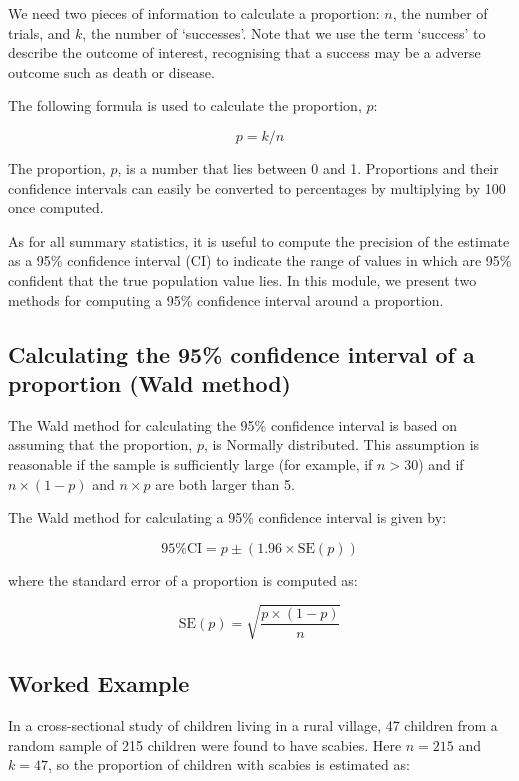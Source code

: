 \documentclass[
]{memoir}
\begin{document}
We need two pieces of information to calculate a proportion: \(n\), the number of trials, and \(k\), the number of `successes'. Note that we use the term `success' to describe the outcome of interest, recognising that a success may be a adverse outcome such as death or disease.

The following formula is used to calculate the proportion, \(p\):

\[ p = k / n \]

The proportion, \(p\), is a number that lies between 0 and 1. Proportions and their confidence intervals can easily be converted to percentages by multiplying by 100 once computed.

As for all summary statistics, it is useful to compute the precision of the estimate as a 95\% confidence interval (CI) to indicate the range of values in which are 95\% confident that the true population value lies. In this module, we present two methods for computing a 95\% confidence interval around a proportion.

\hypertarget{calculating-the-95-confidence-interval-of-a-proportion-wald-method}{%
\subsection{Calculating the 95\% confidence interval of a proportion (Wald method)}\label{calculating-the-95-confidence-interval-of-a-proportion-wald-method}}

The Wald method for calculating the 95\% confidence interval is based on assuming that the proportion, \(p\), is Normally distributed. This assumption is reasonable if the sample is sufficiently large (for example, if \(n>30\)) and if \(n \times (1-p)\) and \(n \times p\) are both larger than 5.

The Wald method for calculating a 95\% confidence interval is given by:

\[\text{95\% CI} = p \pm (1.96 \times \text{SE}(p))\]

where the standard error of a proportion is computed as:

\[\text{SE}(p) = \sqrt{\frac{p \times (1 - p)}{n}}\]

\hypertarget{worked-example-6}{%
\subsection{Worked Example}\label{worked-example-6}}

In a cross-sectional study of children living in a rural village, 47 children from a random sample of 215 children were found to have scabies. Here \(n=215\) and \(k=47\), so the proportion of children with scabies is estimated as:
\end{document}

